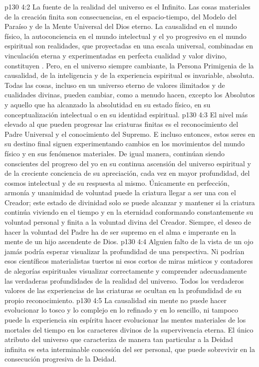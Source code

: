 \vs p130 4:2 \pc La fuente de la realidad del universo es el Infinito. Las cosas materiales de la creación finita son consecuencias, en el espacio\hyp{}tiempo, del Modelo del Paraíso y de la Mente Universal del Dios eterno. La causalidad en el mundo físico, la autoconciencia en el mundo intelectual y el yo progresivo en el mundo espiritual son realidades, que proyectadas en una escala universal, combinadas en vinculación eterna y experimentadas en perfecta cualidad y valor divino, constituyen . Pero, en el universo siempre cambiante, la Persona Primigenia de la causalidad, de la inteligencia y de la experiencia espiritual es invariable, absoluta. Todas las cosas, incluso en un universo eterno de valores ilimitados y de cualidades divinas, pueden cambiar, como a menudo hacen, excepto los Absolutos y aquello que ha alcanzado la absolutidad en su estado físico, en su conceptualización intelectual o en su identidad espiritual.
\vs p130 4:3 El nivel más elevado al que pueden progresar las criaturas finitas es el reconocimiento del Padre Universal y el conocimiento del Supremo. E incluso entonces, estos seres en su destino final siguen experimentando cambios en los movimientos del mundo físico y en sus fenómenos materiales. De igual manera, continúan siendo conscientes del progreso del yo en su continua ascensión del universo espiritual y de la creciente conciencia de su apreciación, cada vez en mayor profundidad, del cosmos intelectual y de su respuesta al mismo. Únicamente en perfección, armonía y unanimidad de voluntad puede la criatura llegar a ser una con el Creador; este estado de divinidad solo se puede alcanzar y mantener si la criatura continúa viviendo en el tiempo y en la eternidad conformando constantemente su voluntad personal y finita a la voluntad divina del Creador. Siempre, el deseo de hacer la voluntad del Padre ha de ser supremo en el alma e imperante en la mente de un hijo ascendente de Dios.
\vs p130 4:4 Alguien falto de la vista de un ojo jamás podría esperar visualizar la profundidad de una perspectiva. Ni podrían esos científicos materialistas tuertos ni esos cortos de miras místicos y contadores de alegorías espirituales visualizar correctamente y comprender adecuadamente las verdaderas profundidades de la realidad del universo. Todos los verdaderos valores de las experiencias de las criaturas se ocultan en la profundidad de su propio reconocimiento.
\vs p130 4:5 La causalidad sin mente no puede hacer evolucionar lo tosco y lo complejo en lo refinado y en lo sencillo, ni tampoco puede la experiencia sin espíritu hacer evolucionar las mentes materiales de los mortales del tiempo en los caracteres divinos de la supervivencia eterna. El único atributo del universo que caracteriza de manera tan particular a la Deidad infinita es esta interminable concesión del ser personal, que puede sobrevivir en la consecución progresiva de la Deidad.
